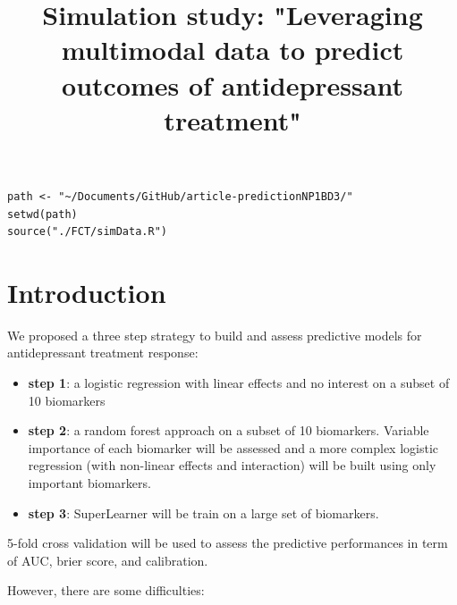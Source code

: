\documentclass[12pt]{article}
\date{}
\title{Simulation study: "Leveraging multimodal data to predict outcomes of antidepressant treatment"}
\begin{document}
\maketitle
\lstset{language=r,label= ,caption= ,captionpos=b,numbers=none}
\begin{lstlisting}
path <- "~/Documents/GitHub/article-predictionNP1BD3/"
setwd(path)
source("./FCT/simData.R")
\end{lstlisting}

\section{Introduction}
\label{sec:org9a1599e}

We proposed a three step strategy to build and assess predictive
models for antidepressant treatment response:
\begin{itemize}
\item \textbf{step 1}: a logistic regression with linear effects and no interest
on a subset of 10 biomarkers
\item \textbf{step 2}: a random forest approach on a subset of 10
biomarkers. Variable importance of each biomarker will be assessed
and a more complex logistic regression (with non-linear effects and
interaction) will be built using only important biomarkers.
\item \textbf{step 3}: SuperLearner will be train on a large set of biomarkers.
\end{itemize}

5-fold cross validation will be used to assess the predictive
performances in term of AUC, brier score, and calibration.

\bigskip

However, there are some difficulties:
\end{document}
